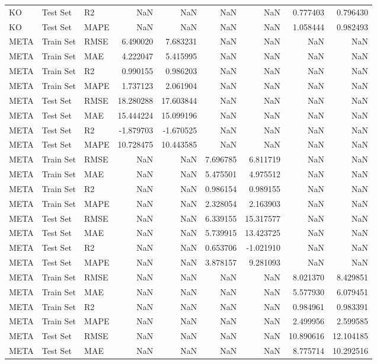 \begin{tabular}{lllrrrrrr}
KO & Test Set & R2 & NaN & NaN & NaN & NaN & 0.777403 & 0.796430 \\
KO & Test Set & MAPE & NaN & NaN & NaN & NaN & 1.058444 & 0.982493 \\
META & Train Set & RMSE & 6.490020 & 7.683231 & NaN & NaN & NaN & NaN \\
META & Train Set & MAE & 4.222047 & 5.415995 & NaN & NaN & NaN & NaN \\
META & Train Set & R2 & 0.990155 & 0.986203 & NaN & NaN & NaN & NaN \\
META & Train Set & MAPE & 1.737123 & 2.061904 & NaN & NaN & NaN & NaN \\
META & Test Set & RMSE & 18.280288 & 17.603844 & NaN & NaN & NaN & NaN \\
META & Test Set & MAE & 15.444224 & 15.099196 & NaN & NaN & NaN & NaN \\
META & Test Set & R2 & -1.879703 & -1.670525 & NaN & NaN & NaN & NaN \\
META & Test Set & MAPE & 10.728475 & 10.443585 & NaN & NaN & NaN & NaN \\
META & Train Set & RMSE & NaN & NaN & 7.696785 & 6.811719 & NaN & NaN \\
META & Train Set & MAE & NaN & NaN & 5.475501 & 4.975512 & NaN & NaN \\
META & Train Set & R2 & NaN & NaN & 0.986154 & 0.989155 & NaN & NaN \\
META & Train Set & MAPE & NaN & NaN & 2.328054 & 2.163903 & NaN & NaN \\
META & Test Set & RMSE & NaN & NaN & 6.339155 & 15.317577 & NaN & NaN \\
META & Test Set & MAE & NaN & NaN & 5.739915 & 13.423725 & NaN & NaN \\
META & Test Set & R2 & NaN & NaN & 0.653706 & -1.021910 & NaN & NaN \\
META & Test Set & MAPE & NaN & NaN & 3.878157 & 9.281093 & NaN & NaN \\
META & Train Set & RMSE & NaN & NaN & NaN & NaN & 8.021370 & 8.429851 \\
META & Train Set & MAE & NaN & NaN & NaN & NaN & 5.577930 & 6.079451 \\
META & Train Set & R2 & NaN & NaN & NaN & NaN & 0.984961 & 0.983391 \\
META & Train Set & MAPE & NaN & NaN & NaN & NaN & 2.499956 & 2.599585 \\
META & Test Set & RMSE & NaN & NaN & NaN & NaN & 10.890616 & 12.104185 \\
META & Test Set & MAE & NaN & NaN & NaN & NaN & 8.775714 & 10.292516 \\

\end{tabular}
